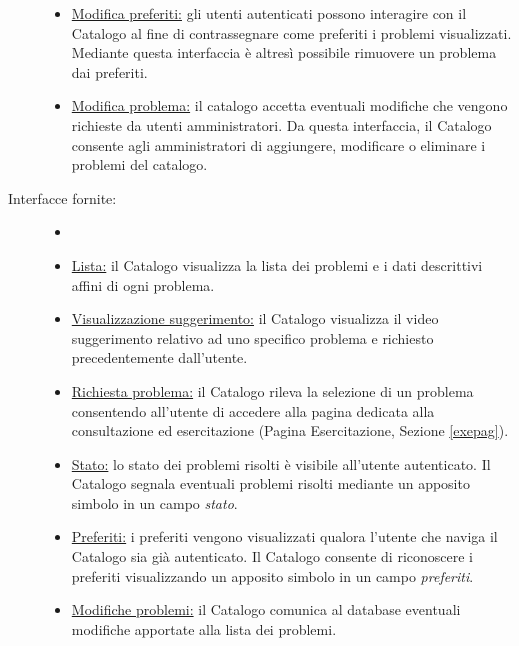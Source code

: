 \documentclass[11pt, a4paper]{article}
\theoremstyle{definition} %
\begin{document}
\begin{description}
\begin{itemize}
        \item \underline{Modifica preferiti:} gli utenti autenticati possono interagire
        con il Catalogo al fine di contrassegnare come preferiti i problemi visualizzati.
        Mediante questa interfaccia è altresì possibile rimuovere un problema dai preferiti.

        \item \underline{Modifica problema:} il catalogo accetta eventuali modifiche
        che vengono richieste da utenti amministratori. Da questa interfaccia, il
        Catalogo consente agli amministratori di aggiungere, modificare o eliminare
        i problemi del catalogo.
    \end{itemize}

    \item[Interfacce fornite:]
    \begin{itemize}
        \item[]
        
        \item \underline{Lista:} il Catalogo visualizza la lista dei problemi e i
        dati descrittivi affini di ogni problema.

        \item \underline{Visualizzazione suggerimento:} il Catalogo visualizza il
        video suggerimento relativo ad uno specifico problema e richiesto precedentemente
        dall'utente.

        \item \underline{Richiesta problema:} il Catalogo rileva la selezione di
        un problema consentendo all'utente di accedere alla pagina dedicata alla
        consultazione ed esercitazione (Pagina Esercitazione, Sezione \ref{exepag}).
        
        \item \underline{Stato:} lo stato dei problemi risolti è visibile all'utente
        autenticato. Il Catalogo segnala eventuali problemi risolti
        mediante un apposito simbolo in un campo \textit{stato}.

        \item \underline{Preferiti:} i preferiti vengono visualizzati qualora
        l'utente che naviga il Catalogo sia già autenticato. Il Catalogo consente
        di riconoscere i preferiti visualizzando un apposito simbolo in un campo
        \textit{preferiti}.

        \item \underline{Modifiche problemi:} il Catalogo comunica al database eventuali
        modifiche apportate alla lista dei problemi.
    \end{itemize}
\end{description}
\end{document}
